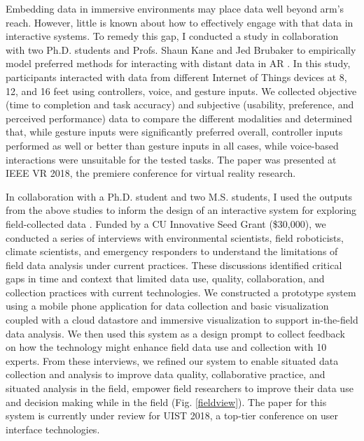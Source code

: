 \documentclass[11pt]{article}
\begin{document}
Embedding data in immersive environments may place data well beyond arm's reach. However, little is known about how to effectively engage with that data in interactive systems. To remedy this gap, I conducted a study in collaboration with two Ph.D. students and Profs. Shaun Kane and Jed Brubaker to empirically model preferred methods for interacting with distant data in AR \cite{whitlock2018Distal}. In this study, participants interacted with data from different Internet of Things devices at 8, 12, and 16 feet using controllers, voice, and gesture inputs. We collected objective (time to completion and task accuracy) and subjective (usability, preference, and perceived performance) data to compare the different modalities and determined that, while gesture inputs were significantly preferred overall, controller inputs performed as well or better than gesture inputs in all cases, while voice-based interactions were unsuitable for the tested tasks. The paper was presented at IEEE VR 2018, the premiere conference for virtual reality research. 

In collaboration with a Ph.D. student and two M.S. students, I used the outputs from the above studies to inform the design of an interactive system for exploring field-collected data \cite{whitlock2018FieldView}. Funded by a CU Innovative Seed Grant (\$30,000), we conducted a series of interviews with environmental scientists, field roboticists, climate scientists, and emergency responders to understand the limitations of field data analysis under current practices. These discussions identified critical gaps in time and context that limited data use, quality, collaboration, and collection practices with current technologies. We constructed a prototype system using a mobile phone application for data collection and basic visualization coupled with a cloud datastore and immersive visualization to support in-the-field data analysis. We then used this system as a design prompt to collect feedback on how the technology might enhance field data use and collection with 10 experts.  From these interviews, we refined our system to enable situated data collection and analysis to improve data quality, collaborative practice, and situated analysis in the field, empower field researchers to improve their data use and decision making while in the field (Fig. \ref{fieldview}). The paper for this system is currently under review for UIST 2018, a top-tier conference on user interface technologies. 
\end{document}
